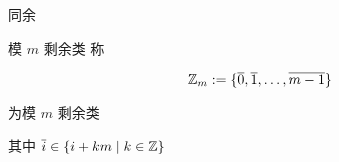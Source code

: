 \begin{frame}{同余}
	\label{cgrunt:def:cgrunt}


\end{frame}


\begin{frame}{模 \(m\) 剩余类}
	\label{cgrunt:def:remainings}
	称

	\begin{equation}
		\Bbb{Z}_m:=\{\overline{0},\overline{1},\dots,\overline{m-1}\}
	\end{equation}

	为模 \(m\) 剩余类\pause

	其中 \(\overline{i}\in\{i+km\mid k\in\Bbb{Z}\}\)
\end{frame}
